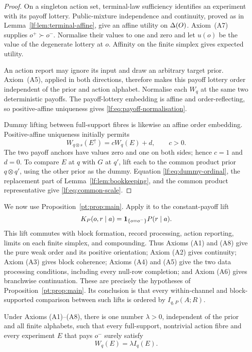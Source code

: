 \begin{proof}
On a singleton action set, terminal-law sufficiency identifies an experiment
with its payoff lottery.  Public-mixture independence and continuity, proved as
in Lemma~\ref{lf:lem:terminal-affine}, give an affine utility on $\Delta(O)$.
Axiom~\textup{(A7)} supplies $o^+\succ o^-$.  Normalise their values to one
and zero and let $u(o)$ be the value of the degenerate lottery at $o$.
Affinity on the finite simplex gives expected utility.

An action report may ignore its input and draw an arbitrary target prior.
Axiom~\textup{(A5)}, applied in both directions, therefore makes this payoff
lottery order independent of the prior and action alphabet.  Normalise each
$W_q$ at the same two deterministic payoffs.  The payoff-lottery embedding is
affine and order-reflecting, so positive-affine uniqueness gives
\eqref{lf:eq:payoff-normalisation}.

Dummy lifting between full-support fibres is likewise an affine order
embedding.  Positive-affine uniqueness initially permits
\[
W_{q\otimes s}(E^\uparrow)=cW_q(E)+d,
\qquad c>0.
\]
The two payoff anchors have values zero and one on both sides; hence $c=1$ and
$d=0$.  To compare $E$ at $q$ with $G$ at $q'$, lift each to the common product
prior $q\otimes q'$, using the other prior as the dummy.  Equation
\eqref{lf:eq:dummy-ordinal}, the replacement part of
Lemma~\ref{lf:lem:bookkeeping}, and the common product representative give
\eqref{lf:eq:common-scale}.
\end{proof}

We now use Proposition~\ref{pt:prop:main}.  Apply it to the
constant-payoff lift
\[
K_P(o,r\mid a)=\mathbf 1_{\{o=o^-\}}P(r\mid a).
\]
This lift commutes with block formation, record processing, action reporting,
limits on each finite simplex, and compounding.  Thus Axioms
\textup{(A1)} and \textup{(A8)} give the pure weak order and its positive
orientation; Axiom \textup{(A2)} gives continuity; Axiom \textup{(A3)} gives
block coherence; Axioms \textup{(A4)} and \textup{(A5)} give the two data
processing conditions, including every null-row completion; and Axiom
\textup{(A6)} gives branchwise continuation.  These are precisely the
hypotheses of Proposition~\ref{pt:prop:main}.  Its conclusion is that every
within-channel and block-supported comparison between such lifts is ordered by
$I_{q,P}(A;R)$.

\begin{lemma}\label{lf:lem:trace-scale}
Under Axioms \textup{(A1)--(A8)}, there is one number $\lambda>0$, independent
of the prior and all finite alphabets, such that every full-support,
nontrivial action fibre and every experiment $E$ that pays $o^-$ surely satisfy
\begin{equation}
W_q(E)=\lambda I_q(E).
\label{lf:eq:sure-low}
\end{equation}
\end{lemma}

